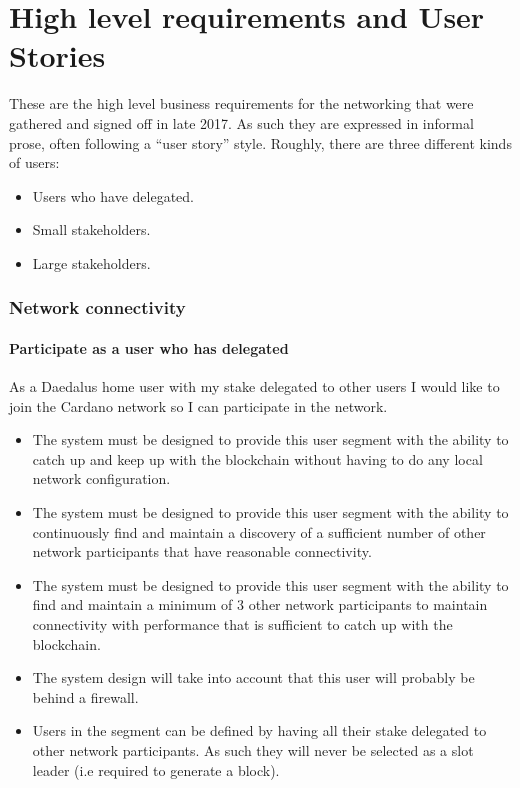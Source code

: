 \documentclass{report}
\newcommand{\wip}[1]{\color{magenta}{#1}\color{black}}
\theoremstyle{definition}{
  \newtheorem{lemma}{Lemma}[section] %
  \newtheorem{definition}[lemma]{Definition}
}
\theoremstyle{theorem}{
  \newtheorem{invariant}[lemma]{Invariant}
  \newtheorem{proofobligation}[lemma]{Proof Obligation}
}
\numberwithin{equation}{lemma}
\begin{document}
\wip{TODO:extended abstract, scope of the document}

\section{High level requirements and User Stories}

These are the high level business requirements for the networking that were
gathered and signed off in late 2017. As such they are expressed in informal
prose, often following a ``user story'' style.
Roughly, there are three different kinds of users:
\begin{itemize}
\item Users who have delegated.
\item Small stakeholders.
\item Large stakeholders.
\end{itemize}

\subsubsection{Network connectivity}\label{network-connectivity}

\paragraph{Participate as a user who has delegated}

As a Daedalus home user with my stake delegated to other users
I would like to join the Cardano network so I can participate in the network.
\begin{itemize}
\item The system must be designed to provide this user segment with the ability
      to catch up and keep up with the blockchain without having
      to do any local network configuration.
\item The system must be designed to provide this user segment with the ability to
      continuously find and maintain a discovery of a sufficient number of
      other network participants that have reasonable connectivity.
\item The system must be designed to provide this user segment with the ability to
      find and maintain a minimum of 3 other network participants to maintain
      connectivity with performance that is sufficient to catch up with the
      blockchain.
\item The system design will take into account that this user will probably be
      behind a firewall.
\item Users in the segment can be defined by having all their stake
      delegated to other network participants.
      As such they will never be selected as a slot leader (i.e required to generate a block).
\end{itemize}
\end{document}
